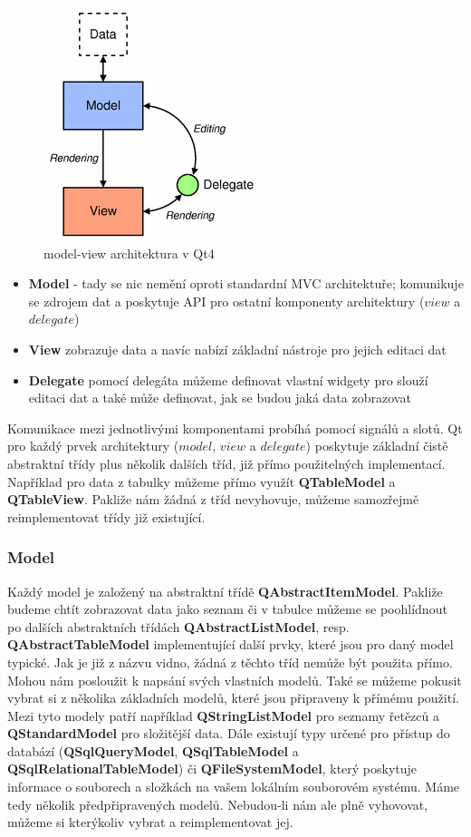 \begin{figure}[h]
	\centering
	\includegraphics[scale=0.7]{pictures/qt/mv}
	\caption{model-view architektura v Qt4}
	\label{mvc}
\end{figure}

\begin{itemize}
	\item{\textbf{Model}} - tady se nic nemění oproti standardní MVC architektuře; komunikuje se zdrojem dat a poskytuje API pro ostatní komponenty architektury ($view$ a $delegate$)
	\item{\textbf{View}} zobrazuje data a navíc nabízí základní nástroje pro jejich editaci dat
	\item{\textbf{Delegate}} pomocí delegáta můžeme definovat vlastní widgety pro slouží editaci dat a také může definovat, jak se budou jaká data zobrazovat
\end{itemize}

Komunikace mezi jednotlivými komponentami probíhá pomocí signálů a slotů. Qt pro každý prvek architektury ($model$, $view$ a $delegate$) poskytuje základní čistě abstraktní třídy plus několik dalších tříd, již přímo použitelných implementací. Například pro data z tabulky můžeme přímo využít \textbf{QTableModel} a \textbf{QTableView}. Pakliže nám žádná z tříd nevyhovuje, můžeme samozřejmě reimplementovat třídy již existující.

\subsubsection*{Model}
Každý model je založený na abstraktní třídě \textbf{QAbstractItemModel}. Pakliže budeme chtít zobrazovat data jako seznam či v tabulce můžeme se poohlídnout po dalších abstraktních třídách \textbf{QAbstractListModel}, resp. \textbf{QAbstractTableModel} implementující další prvky, které jsou pro daný model typické. Jak je již z názvu vidno, žádná z těchto tříd nemůže být použita přímo. Mohou nám posloužit k napsání svých vlastních modelů. Také se můžeme pokusit vybrat si z několika základních modelů, které jsou připraveny k přímému použití. Mezi tyto modely patří například \textbf{QStringListModel} pro seznamy řetězců a \textbf{QStandardModel} pro složitější data. Dále existují typy určené pro přístup do databází (\textbf{QSqlQueryModel}, \textbf{QSqlTableModel} a \textbf{QSqlRelationalTableModel}) či \textbf{QFileSystemModel}, který poskytuje informace o souborech a složkách na vašem lokálním souborovém systému. Máme tedy několik předpřipravených modelů. Nebudou-li nám ale plně vyhovovat, můžeme si kterýkoliv vybrat a reimplementovat jej.

